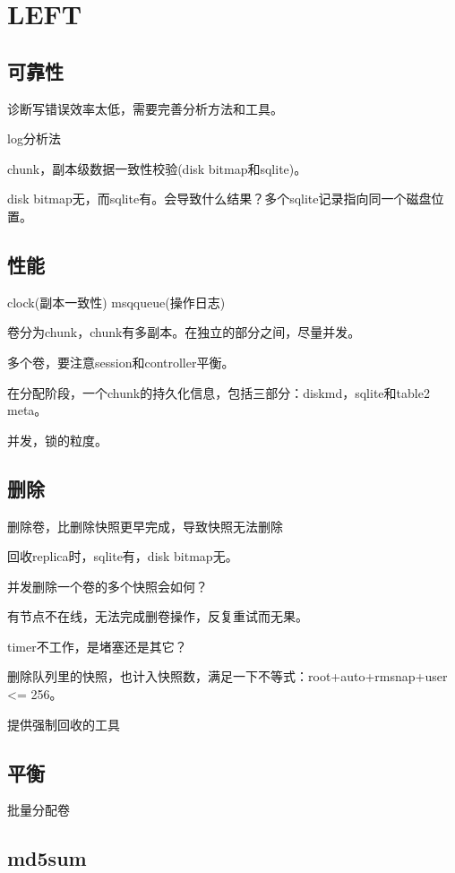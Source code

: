 \section{LEFT}

\subsection{可靠性}

诊断写错误效率太低，需要完善分析方法和工具。

log分析法

chunk，副本级数据一致性校验(disk bitmap和sqlite)。

disk bitmap无，而sqlite有。会导致什么结果？多个sqlite记录指向同一个磁盘位置。

\subsection{性能}

clock(副本一致性)
msqqueue(操作日志)

卷分为chunk，chunk有多副本。在独立的部分之间，尽量并发。

多个卷，要注意session和controller平衡。

在分配阶段，一个chunk的持久化信息，包括三部分：diskmd，sqlite和table2 meta。

并发，锁的粒度。

\subsection{删除}

删除卷，比删除快照更早完成，导致快照无法删除

回收replica时，sqlite有，disk bitmap无。

并发删除一个卷的多个快照会如何？

有节点不在线，无法完成删卷操作，反复重试而无果。

timer不工作，是堵塞还是其它？

删除队列里的快照，也计入快照数，满足一下不等式：root+auto+rmsnap+user <= 256。

提供强制回收的工具

\subsection{平衡}

批量分配卷

\subsection{md5sum}

